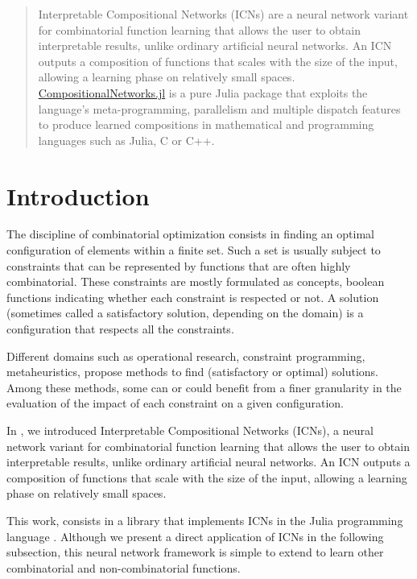 \documentclass{juliacon}
\newcommand{\cnjl}{\href{https://github.com/JuliaConstraints/CompositionalNetworks.jl}{CompositionalNetworks.jl}\xspace}
\begin{document}


\maketitle

\begin{abstract}
  Interpretable Compositional Networks (ICNs) are a neural network variant for combinatorial function learning that allows the user to obtain interpretable results, unlike ordinary artificial neural networks. An ICN outputs a composition of functions that scales with the size of the input, allowing a learning phase on relatively small spaces.
  \cnjl is a pure Julia package that exploits the language's meta-programming, parallelism and multiple dispatch features to produce learned compositions in mathematical and programming languages such as Julia, C or C++.
\end{abstract}

\section{Introduction}
\label{sec:introduction}

The discipline of combinatorial optimization consists in finding an optimal configuration of elements within a finite set. Such a set is usually subject to constraints that can be represented by functions that are often highly combinatorial. These constraints are mostly formulated as concepts, boolean functions indicating whether each constraint is respected or not. A solution (sometimes called a satisfactory solution, depending on the domain) is a configuration that respects all the constraints.

Different domains such as operational research, constraint programming, metaheuristics, propose methods to find (satisfactory or optimal) solutions. Among these methods, some can or could benefit from a finer granularity in the evaluation of the impact of each constraint on a given configuration.

In \cite{richoux2020automatic}, we introduced Interpretable Compositional Networks (ICNs), a neural network variant for combinatorial function learning that allows the user to obtain interpretable results, unlike ordinary artificial neural networks. An ICN outputs a composition of functions that scale with the size of the input, allowing a learning phase on relatively small spaces.

This work, consists in a library that implements ICNs in the Julia programming language \cite{bezanson2017julia}. Although we present a direct application of ICNs in the following subsection, this neural network framework is simple to extend to learn other combinatorial and non-combinatorial functions.
\end{document}
